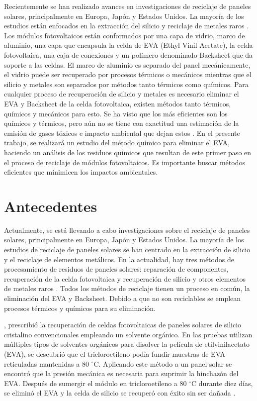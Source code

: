 Recientemente se han realizado avances en investigaciones de reciclaje de paneles solares, principalmente en Europa, Japón y Estados Unidos. La mayoría de los estudios están enfocados en la extracción del silicio y reciclaje de metales raros \citep{Xu2012}. Los módulos fotovoltaicos están conformados por una capa de vidrio, marco de aluminio, una capa que encapsula la celda de EVA (Ethyl Vinil Acetate), la celda fotovoltaica, una caja de conexiones y un polímero denominado Backsheet que da soporte a las celdas. El marco de aluminio es separado del panel mecánicamente, el vidrio puede ser recuperado por procesos térmicos o mecánicos mientras que el silicio y metales son separados por métodos tanto térmicos como químicos.  Para cualquier proceso de recuperación de silicio y metales es necesario eliminar el EVA y Backsheet de la celda fotovoltaica, existen métodos tanto térmicos, químicos y mecánicos para esto. Se ha visto que los más eficientes son los químicos y térmicos, pero aún no se tiene con exactitud una estimación de la emisión de gases tóxicos e impacto ambiental que dejan estos \citep{Fiandra2019}. En el presente trabajo, se realizará un estudio del método químico para eliminar el EVA, haciendo un análisis de los residuos químicos que resultan de este primer paso en el proceso de reciclaje de módulos fotovoltaicos. Es importante buscar métodos eficientes que minimicen los impactos ambientales. 

\section{Antecedentes}
\label{sec:Antecedentes}
Actualmente, se está llevando a cabo investigaciones sobre el reciclaje de paneles solares, principalmente en Europa, Japón y Estados Unidos. La mayoría de los estudios de reciclaje de paneles solares se han centrado en la extracción de silicio y el reciclaje de elementos metálicos. En la actualidad, hay tres métodos de procesamiento de residuos de paneles solares: reparación de componentes, recuperación de la celda fotovoltaica y recuperación de silicio y otros elementos de metales raros \citep{Xu2012}. Todos los métodos de reciclaje tienen un proceso en común, la eliminación del EVA y Backsheet. Debido a que no son reciclables se emplean procesos térmicos y químicos para su eliminación. 

\citet{Doi2001}, prescribió la recuperación de celdas fotovoltaicas de paneles solares de silicio cristalino convencionales empleando un solvente orgánico. En las pruebas  utilizan múltiples tipos de solventes orgánicos para disolver la película de etilvinilacetato (EVA), se descubrió que el tricloroetileno podía fundir muestras de EVA reticuladas mantenidas a 80 $^{\circ}$C. Aplicando este método a un panel solar se encontró que la presión mecánica es necesaria para suprimir la hinchazón del EVA. Después de sumergir el módulo en tricloroetileno a 80 $^{\circ}$C durante diez días, se eliminó el EVA y la celda de silicio se recuperó con éxito sin ser dañada \citep{Doi2001}.

